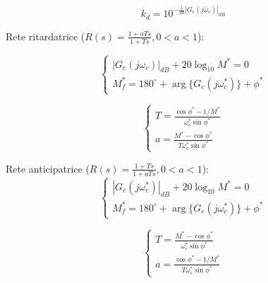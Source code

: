 \documentclass[answers, a4paper, 11pt]{exam}
\begin{document}
\begin{multicols}{2}
\begin{equation}
    k_d = 10^{-\frac{1}{20}|G_e(j\bar{\omega}_c)|_{dB}}
\end{equation}

Rete ritardatrice ($R(s) = \frac{1+aTs}{1+Ts}, 0 < a < 1$):

\begin{equation}
    \begin{cases}
    |G_e(j\omega_c)|_{dB}+ 20\log_{10} M^*=0 \\
    M_f^* = 180^\circ + \arg\{G_e(j \omega_c^*)\} + \phi^*
    \end{cases}
\end{equation}

\begin{equation}
    \begin{cases}
    T = \frac{\cos\phi^* - 1/M^*}{\omega_c^*\sin\phi^*} \\
    a = \frac{M^* - \cos \phi^*}{T \omega_c^* \sin \phi^*}
    \end{cases}
\end{equation}

Rete anticipatrice ($R(s) = \frac{1 + T s}{1 + aTs}, 0 < a < 1$):
\begin{equation}
\begin{cases}
    |G_e(j \omega_c^*)|_{dB} + 20 \log_{10} M^* = 0 \\
    M_f^* = 180^\circ + \arg\{G_e(j\omega_c^*)\} + \phi^*
\end{cases}
\end{equation}

\begin{equation}
    \begin{cases}
    T = \frac{M^* - \cos\phi^*}{\omega_c^*\sin\phi^*} \\
    a = \frac{\cos\phi^* - 1/M^*}{T \omega_c^* \sin \phi^*}
    \end{cases}
\end{equation}

\end{multicols}
\end{document}
